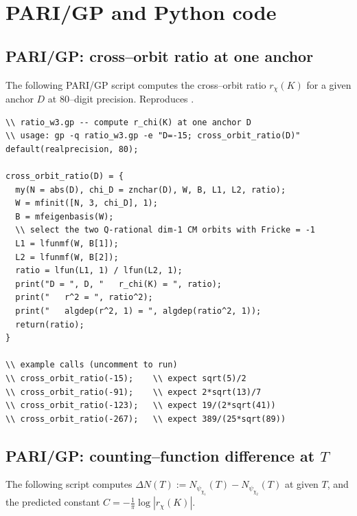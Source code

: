 \documentclass[11pt]{amsart}
\theoremstyle{definition}
\theoremstyle{remark}
\begin{document}
\appendix

\section{PARI/GP and Python code}\label{app:code}

\subsection{PARI/GP: cross--orbit ratio at one anchor}\label{ssec:pari-code}
The following PARI/GP script computes the cross--orbit ratio
\(r_\chi(K)\) for a given anchor \(D\) at \(80\)--digit precision.
Reproduces .

\begin{lstlisting}[style=pari, caption={PARI/GP: cross--orbit ratio at
weight 3.}]
\\ ratio_w3.gp -- compute r_chi(K) at one anchor D
\\ usage: gp -q ratio_w3.gp -e "D=-15; cross_orbit_ratio(D)"
default(realprecision, 80);

cross_orbit_ratio(D) = {
  my(N = abs(D), chi_D = znchar(D), W, B, L1, L2, ratio);
  W = mfinit([N, 3, chi_D], 1);
  B = mfeigenbasis(W);
  \\ select the two Q-rational dim-1 CM orbits with Fricke = -1
  L1 = lfunmf(W, B[1]);
  L2 = lfunmf(W, B[2]);
  ratio = lfun(L1, 1) / lfun(L2, 1);
  print("D = ", D, "   r_chi(K) = ", ratio);
  print("   r^2 = ", ratio^2);
  print("   algdep(r^2, 1) = ", algdep(ratio^2, 1));
  return(ratio);
}

\\ example calls (uncomment to run)
\\ cross_orbit_ratio(-15);    \\ expect sqrt(5)/2
\\ cross_orbit_ratio(-91);    \\ expect 2*sqrt(13)/7
\\ cross_orbit_ratio(-123);   \\ expect 19/(2*sqrt(41))
\\ cross_orbit_ratio(-267);   \\ expect 389/(25*sqrt(89))
\end{lstlisting}

\subsection{PARI/GP: counting--function difference at \(T\)}
\label{ssec:pari-count}
The following script computes \(\Delta N(T) := N_{\psi_{\chi_1}}(T) -
N_{\psi_{\chi_2}}(T)\) at given \(T\), and the predicted constant
\(C = -\tfrac{1}{\pi}\log|r_\chi(K)|\).
\end{document}
